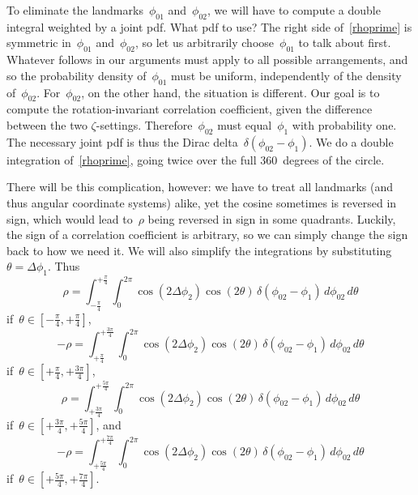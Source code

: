 \documentclass[9pt,technote]{IEEEtran}
\begin{document}
To eliminate the landmarks~$\phi_{01}$ and~$\phi_{02}$, we will have
to compute a double integral weighted by a joint pdf. What pdf to use?
The right side of~\ref{rhoprime} is symmetric in~$\phi_{01}$
and~$\phi_{02}$, so let us arbitrarily choose~$\phi_{01}$ to talk
about first. Whatever follows in our arguments must apply to all
possible arrangements, and so the probability density of~$\phi_{01}$
must be uniform, independently of the density
of~$\phi_{02}$. For~$\phi_{02}$, on the other hand, the situation is
different. Our goal is to compute the rotation-invariant correlation
coefficient, given the difference between the two
$\zeta$-settings. Therefore~$\phi_{02}$ must equal~$\phi_{1}$ with
probability one. The necessary joint pdf is thus the Dirac
delta~$\delta(\phi_{02}-\phi_1)$. We do a double integration
of~\ref{rhoprime}, going twice over the full 360~degrees of the
circle.

There will be this complication, however: we have to treat all
landmarks (and thus angular coordinate systems) alike, yet the cosine
sometimes is reversed in sign, which would lead to~$\rho$ being
reversed in sign in some quadrants. Luckily, the sign of a correlation
coefficient is arbitrary, so we can simply change the sign back to how
we need it. We will also simplify the integrations by
substituting~$\theta=\Delta\phi_1$. Thus
\begin{equation}
\rho = \int_{-\frac{\pi}{4}}^{+\frac{\pi}{4}}\int_0^{2\pi}\cos(2\Delta\phi_2)\cos(2\theta)\,\delta(\phi_{02}-\phi_1)\,d\phi_{02}\,d\theta
\end{equation}
if~$\theta\in[-\frac{\pi}{4},+\frac{\pi}{4}]$,
\begin{equation}
-\rho = \int_{+\frac{\pi}{4}}^{+\frac{3\pi}{4}}\int_0^{2\pi}\cos(2\Delta\phi_2)\cos(2\theta)\,\delta(\phi_{02}-\phi_1)\,d\phi_{02}\,d\theta
\end{equation}
if~$\theta\in[+\frac{\pi}{4},+\frac{3\pi}{4}]$,
\begin{equation}
\rho = \int_{+\frac{3\pi}{4}}^{+\frac{5\pi}{4}}\int_0^{2\pi}\cos(2\Delta\phi_2)\cos(2\theta)\,\delta(\phi_{02}-\phi_1)\,d\phi_{02}\,d\theta
\end{equation}
if~$\theta\in[+\frac{3\pi}{4},+\frac{5\pi}{4}]$, and
\begin{equation}
-\rho = \int_{+\frac{5\pi}{4}}^{+\frac{7\pi}{4}}\int_0^{2\pi}\cos(2\Delta\phi_2)\cos(2\theta)\,\delta(\phi_{02}-\phi_1)\,d\phi_{02}\,d\theta
\end{equation}
if~$\theta\in[+\frac{5\pi}{4},+\frac{7\pi}{4}]$.
\end{document}
